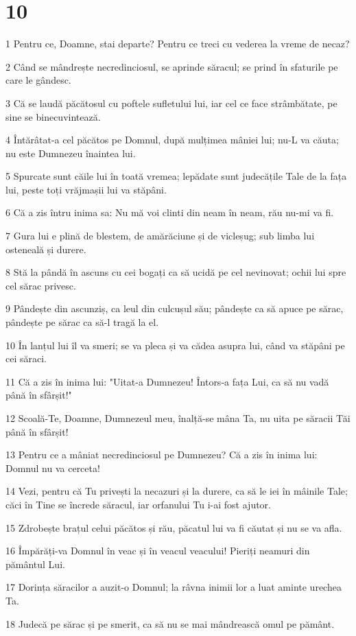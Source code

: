 \chapter{10}

\par 1 Pentru ce, Doamne, stai departe? Pentru ce treci cu vederea la vreme de necaz?
\par 2 Când se mândrește necredinciosul, se aprinde săracul; se prind în sfaturile pe care le gândesc.
\par 3 Că se laudă păcătosul cu poftele sufletului lui, iar cel ce face strâmbătate, pe sine se binecuvintează.
\par 4 Întărâtat-a cel păcătos pe Domnul, după mulțimea mâniei lui; nu-L va căuta; nu este Dumnezeu înaintea lui.
\par 5 Spurcate sunt căile lui în toată vremea; lepădate sunt judecățile Tale de la fața lui, peste toți vrăjmașii lui va stăpâni.
\par 6 Că a zis întru inima sa: Nu mă voi clinti din neam în neam, rău nu-mi va fi.
\par 7 Gura lui e plină de blestem, de amărăciune și de vicleșug; sub limba lui osteneală și durere.
\par 8 Stă la pândă în ascuns cu cei bogați ca să ucidă pe cel nevinovat; ochii lui spre cel sărac privesc.
\par 9 Pândește din ascunziș, ca leul din culcușul său; pândește ca să apuce pe sărac, pândește pe sărac ca să-l tragă la el.
\par 10 În lanțul lui îl va smeri; se va pleca și va cădea asupra lui, când va stăpâni pe cei săraci.
\par 11 Că a zis în inima lui: "Uitat-a Dumnezeu! Întors-a fața Lui, ca să nu vadă până în sfârșit!"
\par 12 Scoală-Te, Doamne, Dumnezeul meu, înalță-se mâna Ta, nu uita pe săracii Tăi până în sfârșit!
\par 13 Pentru ce a mâniat necredinciosul pe Dumnezeu? Că a zis în inima lui: Domnul nu va cerceta!
\par 14 Vezi, pentru că Tu privești la necazuri și la durere, ca să le iei în mâinile Tale; căci în Tine se încrede săracul, iar orfanului Tu i-ai fost ajutor.
\par 15 Zdrobește brațul celui păcătos și rău, păcatul lui va fi căutat și nu se va afla.
\par 16 Împărăți-va Domnul în veac și în veacul veacului! Pieriți neamuri din pământul Lui.
\par 17 Dorința săracilor a auzit-o Domnul; la râvna inimii lor a luat aminte urechea Ta.
\par 18 Judecă pe sărac și pe smerit, ca să nu se mai mândrească omul pe pământ.

